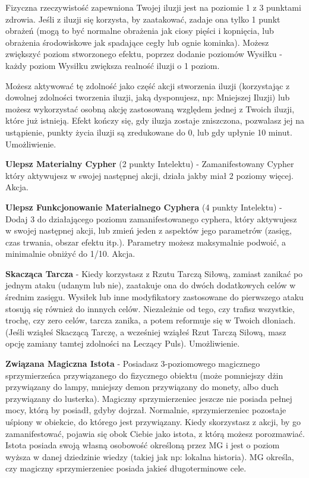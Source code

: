 Fizyczna rzeczywistość zapewniona Twojej iluzji jest na poziomie 1 z 3 punktami zdrowia. Jeśli z iluzji się korzysta, by zaatakować, zadaje ona tylko 1 punkt obrażeń (mogą to być normalne obrażenia jak ciosy pięści i kopnięcia, lub obrażenia środowiskowe jak spadające cegły lub ognie kominka). Możesz zwiększyć poziom stworzonego efektu, poprzez dodanie poziomów Wysiłku - każdy poziom Wysiłku zwiększa realność iluzji o 1 poziom.

Możesz aktywować tę zdolność jako część akcji stworzenia iluzji (korzystając z dowolnej zdolności tworzenia iluzji, jaką dysponujesz, np: Mniejszej Iluzji) lub możesz wykorzystać osobną akcję zastosowaną względem jednej z Twoich iluzji, które już istnieją. Efekt kończy się, gdy iluzja zostaje zniszczona, pozwalasz jej na ustąpienie, punkty życia iluzji są zredukowane do 0, lub gdy upłynie 10 minut. Umożliwienie.

\textbf{Ulepsz Materialny Cypher}\label{sec:Ulepsz Materialny Cypher} (2 punkty Intelektu) - Zamanifestowany Cypher który aktywujesz w swojej następnej akcji, działa jakby miał 2 poziomy więcej. Akcja.

\textbf{Ulepsz Funkcjonowanie Materialnego Cyphera}\label{sec:Ulepsz Funkcjonowanie Materialnego Cyphera} (4 punkty Intelektu) - Dodaj 3 do działającego poziomu zamanifestowanego cyphera, który aktywujesz w swojej następnej akcji, lub zmień jeden z aspektów jego parametrów (zasięg, czas trwania, obszar efektu itp.). Parametry możesz maksymalnie podwoić, a minimalnie obniżyć do 1/10. Akcja. 

\textbf{Skacząca Tarcza}\label{sec:Skacząca Tarcza} - Kiedy korzystasz z Rzutu Tarczą Siłową, zamiast zanikać po jednym ataku (udanym lub nie), zaatakuje ona do dwóch dodatkowych celów w średnim zasięgu. Wysiłek lub inne modyfikatory zastosowane do pierwszego ataku stosują się również do innnych celów. Niezależnie od tego, czy trafisz wszystkie, trochę, czy zero celów, tarcza zanika, a potem reformuje się w Twoich dłoniach. (Jeśli wziąłeś Skaczącą Tarczę, a wcześniej wziąłeś Rzut Tarczą Siłową, masz opcję zamiany tamtej zdolności na Leczący Puls). Umożliwienie. 

\textbf{Związana Magiczna Istota}\label{sec:Związana Magiczna Istota} - Posiadasz 3-poziomowego magicznego sprzymierzeńca przywiązanego do fizycznego obiektu (może pomniejszy dżin przywiązany do lampy, mniejszy demon przywiązany do monety, albo duch przywiązany do lusterka). Magiczny sprzymierzeniec jeszcze nie posiada pełnej mocy, którą by posiadł, gdyby dojrzał. Normalnie, sprzymierzeniec pozostaje uśpiony w obiekcie, do którego jest przywiązany. Kiedy skorzystasz z akcji, by go zamanifestować, pojawia się obok Ciebie jako istota, z którą możesz porozmawiać. Istota posiada swoją własną osobowość określoną przez MG i jest o poziom wyższa w danej dziedzinie wiedzy (takiej jak np: lokalna historia). MG określa, czy magiczny sprzymierzeniec posiada jakieś długoterminowe cele.

